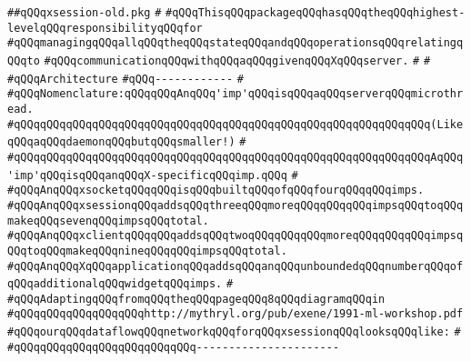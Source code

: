 \label{src/lib/x-kit/xclient/src/window/xsession-old.pkg}
\verb|##qQQqxsession-old.pkg|\newline
\verb|#|\newline
\verb|#qQQqThisqQQqpackageqQQqhasqQQqtheqQQqhighest-levelqQQqresponsibilityqQQqfor|\newline
\verb|#qQQqmanagingqQQqallqQQqtheqQQqstateqQQqandqQQqoperationsqQQqrelatingqQQqto|\newline
\verb|#qQQqcommunicationqQQqwithqQQqaqQQqgivenqQQqXqQQqserver.|\newline
\verb|#|\newline
\verb|#|\newline
\verb|#qQQqArchitecture|\newline
\verb|#qQQq------------|\newline
\verb|#|\newline
\verb|#qQQqNomenclature:qQQqqQQqAnqQQq'imp'qQQqisqQQqaqQQqserverqQQqmicrothread.|\newline
\verb|#qQQqqQQqqQQqqQQqqQQqqQQqqQQqqQQqqQQqqQQqqQQqqQQqqQQqqQQqqQQqqQQq(LikeqQQqaqQQqdaemonqQQqbutqQQqsmaller!)|\newline
\verb|#|\newline
\verb|#qQQqqQQqqQQqqQQqqQQqqQQqqQQqqQQqqQQqqQQqqQQqqQQqqQQqqQQqqQQqqQQqAqQQq'imp'qQQqisqQQqanqQQqX-specificqQQqimp.qQQq|\newline
\verb|#|\newline
\verb|#qQQqAnqQQqxsocketqQQqqQQqisqQQqbuiltqQQqofqQQqfourqQQqqQQqimps.|\newline
\verb|#qQQqAnqQQqxsessionqQQqaddsqQQqthreeqQQqmoreqQQqqQQqqQQqimpsqQQqtoqQQqmakeqQQqsevenqQQqimpsqQQqtotal.|\newline
\verb|#qQQqAnqQQqxclientqQQqqQQqaddsqQQqtwoqQQqqQQqqQQqmoreqQQqqQQqqQQqimpsqQQqtoqQQqmakeqQQqnineqQQqqQQqimpsqQQqtotal.|\newline
\verb|#qQQqAnqQQqXqQQqapplicationqQQqaddsqQQqanqQQqunboundedqQQqnumberqQQqofqQQqadditionalqQQqwidgetqQQqimps.|\newline
\verb|#|\newline
\verb|#qQQqAdaptingqQQqfromqQQqtheqQQqpageqQQq8qQQqdiagramqQQqin|\newline
\verb|#qQQqqQQqqQQqqQQqqQQqhttp://mythryl.org/pub/exene/1991-ml-workshop.pdf|\newline
\verb|#qQQqourqQQqdataflowqQQqnetworkqQQqforqQQqxsessionqQQqlooksqQQqlike:|\newline
\verb|#|\newline
\verb|#qQQqqQQqqQQqqQQqqQQqqQQqqQQq----------------------|\newline
